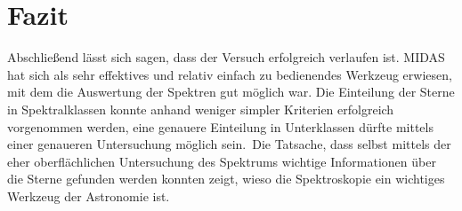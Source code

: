 \section{Fazit}
Abschließend lässt sich sagen, dass der Versuch erfolgreich verlaufen ist. MIDAS hat sich als sehr effektives und relativ einfach zu bedienendes Werkzeug erwiesen, mit dem die Auswertung der Spektren gut möglich war. Die Einteilung der Sterne in Spektralklassen konnte anhand weniger simpler Kriterien erfolgreich vorgenommen werden, eine genauere Einteilung in Unterklassen dürfte mittels einer genaueren Untersuchung möglich sein.\
Die Tatsache, dass selbst mittels der eher oberflächlichen Untersuchung des Spektrums wichtige Informationen über die Sterne gefunden werden konnten zeigt, wieso die Spektroskopie ein wichtiges Werkzeug der Astronomie ist.